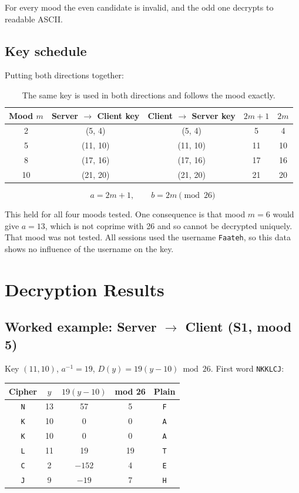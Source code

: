 \documentclass[11pt,a4paper]{article}
\DeclareRobustCommand{\_}{\textunderscore\allowbreak}  %
\newcommand{\ct}[1]{\texttt{#1}}
\newcommand{\csdir}{Client $\rightarrow$ Server}
\newcommand{\scdir}{Server $\rightarrow$ Client}
\begin{document}
For every mood the even candidate is invalid, and the odd one decrypts to readable ASCII.

\subsection{Key schedule}
Putting both directions together:

\begin{table}[H]\centering
\caption{The same key is used in both directions and follows the mood exactly.}
\begin{tabular}{c c c c c}
\toprule
Mood $m$ & \scdir{} key & \csdir{} key & $2m+1$ & $2m$ \\
\midrule
2 & (5, 4) & (5, 4) & 5 & 4 \\
5 & (11, 10) & (11, 10) & 11 & 10 \\
8 & (17, 16) & (17, 16) & 17 & 16 \\
10 & (21, 20) & (21, 20) & 21 & 20 \\
\bottomrule
\end{tabular}
\end{table}

\[
\boxed{\,a = 2m + 1, \qquad b = 2m \pmod{26}\,}
\]

This held for all four moods tested. One consequence is that mood $m = 6$ would give $a = 13$, which is not coprime with
26 and so cannot be decrypted uniquely. That mood was not tested. All sessions used the username \ct{Faateh}, so this
data shows no influence of the username on the key.

\section{Decryption Results}

\subsection{Worked example: \scdir{} (S1, mood 5)}
Key $(11,10)$, $a^{-1}=19$, $D(y) = 19(y-10) \bmod 26$. First word \ct{NKKLCJ}:

\begin{table}[H]\centering
\begin{tabular}{c c c c c}
\toprule
Cipher & $y$ & $19(y-10)$ & mod 26 & Plain \\
\midrule
\ct{N} & 13 & 57   & 5  & \ct{F} \\
\ct{K} & 10 & 0    & 0  & \ct{A} \\
\ct{K} & 10 & 0    & 0  & \ct{A} \\
\ct{L} & 11 & 19   & 19 & \ct{T} \\
\ct{C} & 2  & $-152$ & 4  & \ct{E} \\
\ct{J} & 9  & $-19$  & 7  & \ct{H} \\
\bottomrule
\end{tabular}
\end{table}
\end{document}
